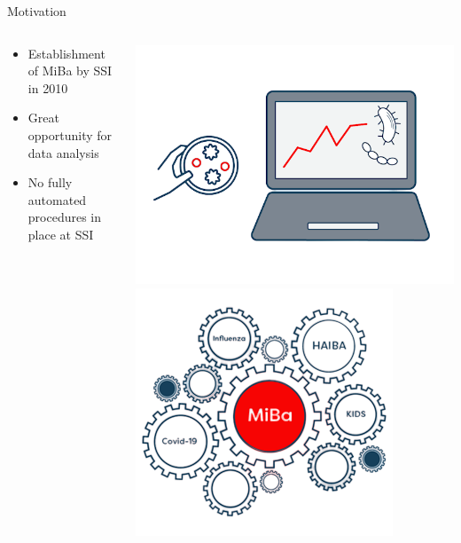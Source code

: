 \documentclass[aspectratio=169]{beamer}
\begin{document}
\begin{frame}{Motivation}
\begin{columns}
\begin{column}{.58\textwidth}
\begin{itemize}
  \item Establishment of MiBa by SSI in 2010
  \item Great opportunity for data analysis
  \item No fully automated procedures in place at SSI
\end{itemize}
\end{column}
\hfill
\begin{column}{.38\textwidth}

 \tiny


\includegraphics[width=0.75\linewidth]{../figures/MiBaPetriComp} \includegraphics[width=0.75\linewidth]{../figures/MiBa} 

 \normalsize
\end{column}
\end{columns}
\end{frame}
\end{document}
